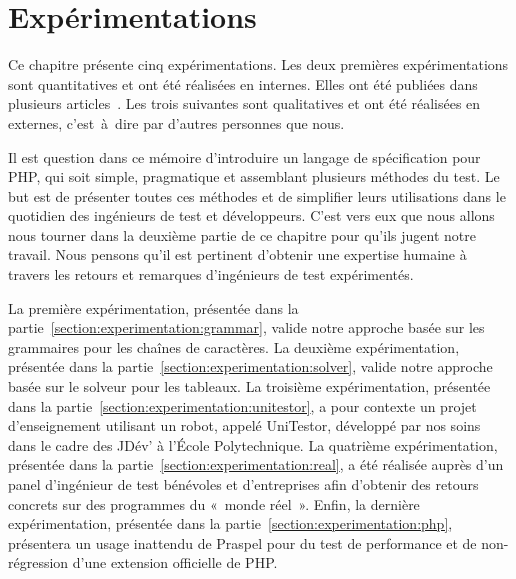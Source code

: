 \chapter{Expérimentations}
\label{chapter:experimentations}

\mminitoc

Ce chapitre présente cinq expérimentations. Les deux premières expérimentations
sont {\strong quantitatives} et ont été réalisées en internes. Elles ont été
publiées dans plusieurs articles~. Les trois suivantes sont {\strong qualitatives} et ont été
réalisées en externes, c'est~à~dire par d'autres personnes que nous.

Il est question dans ce mémoire d'introduire un langage de spécification pour
PHP, qui soit simple, pragmatique et assemblant plusieurs méthodes du test. Le
but est de présenter toutes ces méthodes et de simplifier leurs utilisations
dans le quotidien des ingénieurs de test et développeurs. C'est vers eux que
nous allons nous tourner dans la deuxième partie de ce chapitre pour qu'ils
jugent notre travail. Nous pensons qu'il est pertinent d'obtenir une expertise
humaine à travers les retours et remarques d'ingénieurs de test expérimentés.

La première expérimentation, présentée dans la
partie~\ref{section:experimentation:grammar}, valide notre approche basée sur
les grammaires pour les chaînes de caractères. La deuxième expérimentation,
présentée dans la partie~\ref{section:experimentation:solver}, valide notre
approche basée sur le solveur pour les tableaux. La troisième expérimentation,
présentée dans la partie~\ref{section:experimentation:unitestor}, a pour
contexte un projet d'enseignement utilisant un robot, appelé UniTestor,
développé par nos soins dans le cadre des JDév' à l'École Polytechnique. La
quatrième expérimentation, présentée dans la
partie~\ref{section:experimentation:real}, a été réalisée auprès d'un panel
d'ingénieur de test bénévoles et d'entreprises afin d'obtenir des retours
concrets sur des programmes du «~monde réel~». Enfin, la dernière
expérimentation, présentée dans la partie~\ref{section:experimentation:php},
présentera un usage inattendu de Praspel pour du test de performance et de
non-régression d'une extension officielle de PHP.

